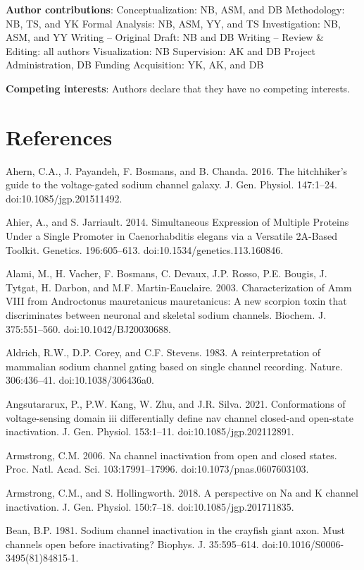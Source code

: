 \noindent \textbf{Author contributions}: 
Conceptualization: NB, ASM, and DB
Methodology: NB, TS, and YK
Formal Analysis: NB, ASM, YY, and TS
Investigation: NB, ASM, and YY
Writing – Original Draft: NB and DB
Writing – Review \& Editing: all authors
Visualization: NB
Supervision: AK and DB
Project Administration, DB
Funding Acquisition: YK, AK, and DB

\noindent \textbf{Competing interests}: Authors declare that they have no competing interests.

\section{References}


\begin{hangparas}{.25in}{1}
Ahern, C.A., J. Payandeh, F. Bosmans, and B. Chanda. 2016. The hitchhiker’s guide to the voltage-gated sodium channel galaxy. J. Gen. Physiol. 147:1–24. doi:10.1085/jgp.201511492.

Ahier, A., and S. Jarriault. 2014. Simultaneous Expression of Multiple Proteins Under a Single Promoter in Caenorhabditis elegans via a Versatile 2A-Based Toolkit. Genetics. 196:605–613. doi:10.1534/genetics.113.160846.

Alami, M., H. Vacher, F. Bosmans, C. Devaux, J.P. Rosso, P.E. Bougis, J. Tytgat, H. Darbon, and M.F. Martin-Eauclaire. 2003. Characterization of Amm VIII from Androctonus mauretanicus mauretanicus: A new scorpion toxin that discriminates between neuronal and skeletal sodium channels. Biochem. J. 375:551–560. doi:10.1042/BJ20030688.

Aldrich, R.W., D.P. Corey, and C.F. Stevens. 1983. A reinterpretation of mammalian sodium channel gating based on single channel recording. Nature. 306:436–41. doi:10.1038/306436a0.

Angsutararux, P., P.W. Kang, W. Zhu, and J.R. Silva. 2021. Conformations of voltage-sensing domain iii differentially define nav channel closed-and open-state inactivation. J. Gen. Physiol. 153:1–11. doi:10.1085/jgp.202112891.

Armstrong, C.M. 2006. Na channel inactivation from open and closed states. Proc. Natl. Acad. Sci. 103:17991–17996. doi:10.1073/pnas.0607603103.

Armstrong, C.M., and S. Hollingworth. 2018. A perspective on Na and K channel inactivation. J. Gen. Physiol. 150:7–18. doi:10.1085/jgp.201711835.

Bean, B.P. 1981. Sodium channel inactivation in the crayfish giant axon. Must channels open before inactivating? Biophys. J. 35:595–614. doi:10.1016/S0006-3495(81)84815-1.


\end{hangparas}
